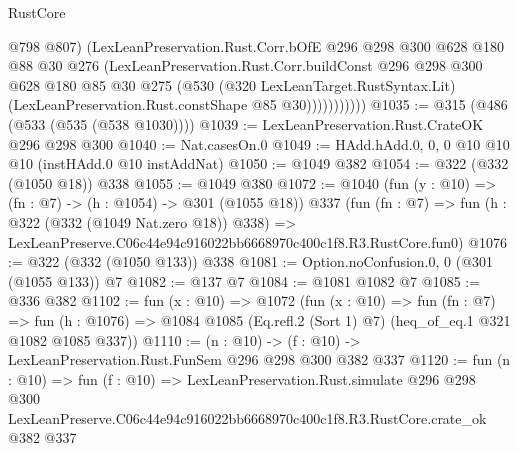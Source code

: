 \begin{lexlean}{RustCore}
\begin{coremodule}
                    @798
                    @807)
                  (LexLeanPreservation.Rust.Corr.bOfE
                    @296
                    @298
                    @300
                    @628
                    @180
                    @88
                    @30
                    @276
                    (LexLeanPreservation.Rust.Corr.buildConst
                      @296
                      @298
                      @300
                      @628
                      @180
                      @85
                      @30
                      @275
                      (@530
                        (@320 LexLeanTarget.RustSyntax.Lit)
                        (LexLeanPreservation.Rust.constShape @85 @30)))))))))))
@1035 := @315 (@486 (@533 (@535 (@538 @1030))))
@1039 := LexLeanPreservation.Rust.CrateOK @296 @298 @300
@1040 := Nat.casesOn.{0}
@1049 := HAdd.hAdd.{0, 0, 0} @10 @10 @10 (instHAdd.{0} @10 instAddNat)
@1050 := @1049 @382
@1054 := @322 (@332 (@1050 @18)) @338
@1055 := @1049 @380
@1072 := @1040
    (fun (y : @10) => (fn : @7) -> (h : @1054) -> @301 (@1055 @18))
    @337
    (fun (fn : @7) =>
    fun (h : @322 (@332 (@1049 Nat.zero @18)) @338) =>
    LexLeanPreserve.C06c44e94c916022bb6668970c400c1f8.R3.RustCore.fun0)
@1076 := @322 (@332 (@1050 @133)) @338
@1081 := Option.noConfusion.{0, 0} (@301 (@1055 @133)) @7
@1082 := @137 @7
@1084 := @1081 @1082 @7
@1085 := @336 @382
@1102 := fun (x : @10) =>
  @1072
    (fun (x : @10) =>
    fun (fn : @7) =>
    fun (h : @1076) => @1084 @1085 (Eq.refl.{2} (Sort 1) @7) (heq_of_eq.{1} @321 @1082 @1085 @337))
@1110 := (n : @10) -> (f : @10) -> LexLeanPreservation.Rust.FunSem @296 @298 @300 @382 @337
@1120 := fun (n : @10) =>
  fun (f : @10) =>
  LexLeanPreservation.Rust.simulate
    @296
    @298
    @300
    LexLeanPreserve.C06c44e94c916022bb6668970c400c1f8.R3.RustCore.crate_ok
    @382
    @337
\end{coremodule}
\end{lexlean}

